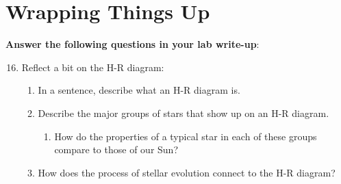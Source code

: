 \documentclass[11pt]{article}
\begin{document}
\section{Wrapping Things Up}
\textbf{Answer the following questions in your lab write-up}:
\begin{enumerate}
\setcounter{enumi}{15}

    \item Reflect a bit on the H-R diagram:
    \begin{enumerate}
        \item In a sentence, describe what an H-R diagram is.
        
        \item Describe the major groups of stars that show up on an H-R diagram. 
        \begin{enumerate}
            \item How do the properties of a typical star in each of these groups compare to those of our Sun?
        \end{enumerate} 
        
        \item How does the process of stellar evolution connect to the H-R diagram?
        
    \end{enumerate}
    
\end{enumerate}
\end{document}
